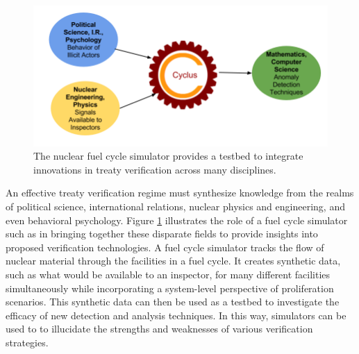 \begin{figure}%
\begin{center}
\includegraphics[natwidth=162bp,natheight=227bp, scale=0.45]{./figs/cyclus_interdiscipline.png}
\end{center}
\caption{The \Cyclus nuclear fuel cycle simulator provides a testbed to integrate innovations in treaty verification across many disciplines.}
\label{fig:cyclus_diagram}
\end{figure}

An effective treaty verification regime must synthesize knowledge from the realms of political science, international relations, nuclear physics and engineering, and even behavioral psychology.  Figure \ref{fig:cyclus_diagram} illustrates  the role of a fuel cycle simulator such as \Cyclus in bringing together these disparate fields to provide insights into proposed verification technologies. A fuel cycle simulator tracks the flow of nuclear material through the facilities in a fuel cycle. It creates synthetic data, such as what would be available to an inspector, for many different facilities simultaneously while incorporating a system-level perspective of proliferation scenarios. This synthetic data can then be used as a testbed to investigate the efficacy of new detection and analysis techniques. In this way, simulators can be used to  to illucidate the strengths and weaknesses of various verification strategies.


